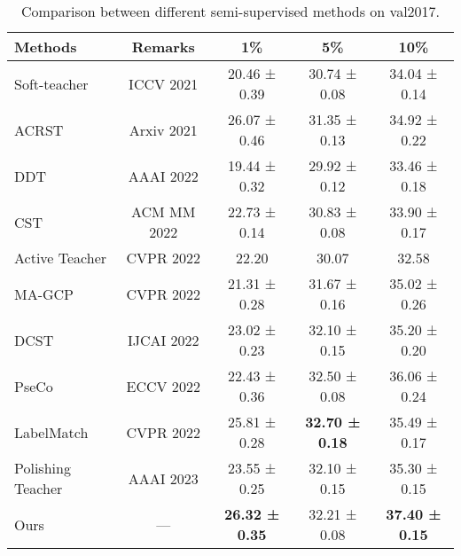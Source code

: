 \documentclass[10pt,twocolumn,letterpaper]{article}
\begin{document}
\begin{table}[t!]
\centering
\caption{Comparison between different semi-supervised methods on val2017.}
\label{tab:partial}
\begin{adjustbox}{width=.495\textwidth,center}
\begin{tabular}{l|c|ccc}
\hline
\textbf{Methods}    \quad      & Remarks           & \quad\textbf{1\%} \quad         & \quad \textbf{5\%} \quad   & \quad \textbf{10\%} \quad        \\ \hline
Soft-teacher\cite{xu2021end} &    ICCV 2021          & 20.46 ± 0.39   & 30.74 ± 0.08   & 34.04 ± 0.14   \\
ACRST \cite{zhang2021semi} & Arxiv 2021 & 26.07 ± 0.46 & 31.35 ± 0.13 & 34.92 ± 0.22 \\
DDT \cite{DDT} & AAAI 2022 & 19.44 ± 0.32 & 29.92 ± 0.12 & 33.46 ± 0.18 \\
CST \cite{CST} & ACM MM 2022 & 22.73 ± 0.14 & 30.83 ± 0.08 & 33.90 ± 0.17 \\
Active Teacher \cite{ActiveTeacher} & CVPR 2022 & 22.20 & 30.07 & 32.58 \\
MA-GCP \cite{MAGCP} & CVPR 2022 & 21.31 ± 0.28 & 31.67 ± 0.16 & 35.02 ± 0.26 \\
DCST \cite{DCST} & IJCAI 2022 & 23.02 ± 0.23 & 32.10 ± 0.15 & 35.20 ± 0.20 \\
PseCo \cite{PseCo} & ECCV 2022 & 22.43 ± 0.36 & 32.50 ± 0.08 & 36.06 ± 0.24 \\
LabelMatch \cite{LabelMatch} & CVPR 2022 & 25.81 ± 0.28 & \textbf{32.70 ± 0.18} & 35.49 ± 0.17 \\
Polishing Teacher \cite{PoshingTeacher} & AAAI 2023 & 23.55 ± 0.25 & 32.10 ± 0.15 & 35.30 ± 0.15 \\
Ours & --- & \textbf{26.32 ± 0.35}   & 32.21 ± 0.08   & \textbf{37.40 ± 0.15}   \\ \hline
\end{tabular}
\end{adjustbox}
\end{table}
\end{document}
